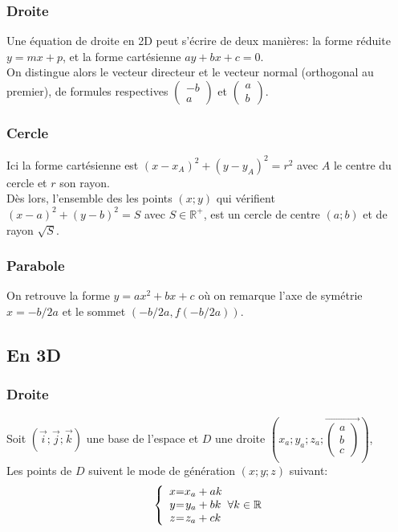 \documentclass{article}
\begin{document}
\subsubsection{Droite}
Une équation de droite en 2D peut s'écrire de deux manières: la forme réduite $y=mx+p$, et la forme cartésienne $ay+bx+c=0$.\\
On distingue alors le vecteur directeur et le vecteur normal (orthogonal au premier), de formules respectives $\begin{pmatrix}-b\\a\end{pmatrix}$ et $\begin{pmatrix}a\\b\end{pmatrix}$.
\subsubsection{Cercle}
Ici la forme cartésienne est $(x-x_A)^2+(y-y_A)^2 = r^2$ avec $A$ le centre du cercle et $r$ son rayon.\\
Dès lors, l'ensemble des les points $(x;y)$ qui vérifient $(x-a)^2+(y-b)^2 = S$ avec $S\in\mathbb{R^+}$, est un cercle de centre $(a;b)$ et de rayon $\sqrt{S}$.
\subsubsection{Parabole}
On retrouve la forme $y=ax^2+bx+c$ où on remarque l'axe de symétrie $x = -b/2a$ et le sommet $(-b/2a,f(-b/2a))$.

\subsection{En 3D}
\subsubsection{Droite}
Soit $(\Vec{i};\Vec{j};\Vec{k})$ une base de l'espace et $D$ une droite $(x_a;y_a;z_a;\Vec{\begin{pmatrix}a\\b\\c\end{pmatrix}})$,\\
Les points de $D$ suivent le mode de génération $(x;y;z)$ suivant:
\[
	\left \{
	\begin{array}{c @{=} c}
		x & x_a + ak \\
		y & y_a + bk \\
		z & z_a + ck 
	\end{array}
	\forall k \in \mathbb{R}
	\right.
\]
\end{document}
